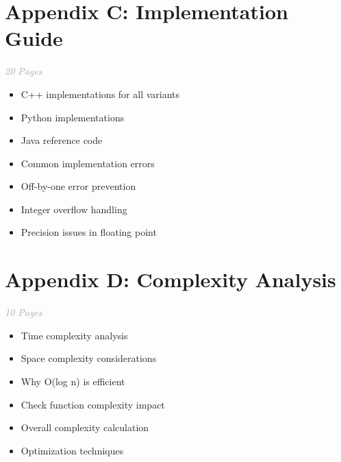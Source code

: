 \documentclass[11pt,a4paper,oneside]{book}
\begin{document}
\section*{Appendix C: Implementation Guide}

\begin{tcolorbox}[
    enhanced,
    colback=white,
    colframe=primaryblue,
    boxrule=1.5pt,
    arc=3mm
]
\textit{\textcolor{darkgray}{20 Pages}}
\end{tcolorbox}

\vspace{0.3cm}

\begin{itemize}[leftmargin=*, itemsep=5pt]
    \item[\textcolor{successgreen}{$\bullet$}] C++ implementations for all variants
    \item[\textcolor{successgreen}{$\bullet$}] Python implementations
    \item[\textcolor{successgreen}{$\bullet$}] Java reference code
    \item[\textcolor{successgreen}{$\bullet$}] Common implementation errors
    \item[\textcolor{successgreen}{$\bullet$}] Off-by-one error prevention
    \item[\textcolor{successgreen}{$\bullet$}] Integer overflow handling
    \item[\textcolor{successgreen}{$\bullet$}] Precision issues in floating point
\end{itemize}

\section*{Appendix D: Complexity Analysis}

\begin{tcolorbox}[
    enhanced,
    colback=white,
    colframe=primaryblue,
    boxrule=1.5pt,
    arc=3mm
]
\textit{\textcolor{darkgray}{10 Pages}}
\end{tcolorbox}

\vspace{0.3cm}

\begin{itemize}[leftmargin=*, itemsep=5pt]
    \item[\textcolor{successgreen}{$\bullet$}] Time complexity analysis
    \item[\textcolor{successgreen}{$\bullet$}] Space complexity considerations
    \item[\textcolor{successgreen}{$\bullet$}] Why O(log n) is efficient
    \item[\textcolor{successgreen}{$\bullet$}] Check function complexity impact
    \item[\textcolor{successgreen}{$\bullet$}] Overall complexity calculation
    \item[\textcolor{successgreen}{$\bullet$}] Optimization techniques
\end{itemize}
\end{document}
